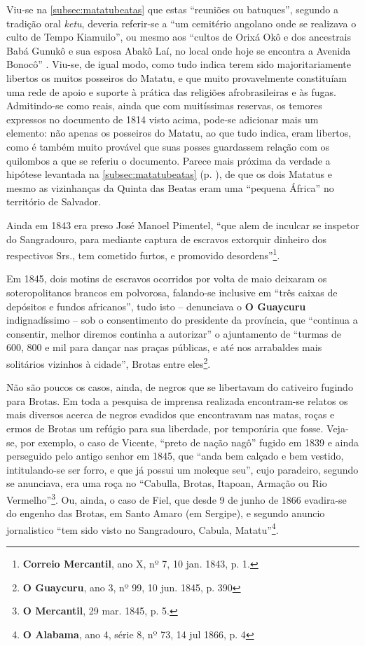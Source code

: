 Viu-se na \autoref{subsec:matatubeatas} que estas ``reuniões ou batuques'', segundo a tradição oral \textit{ketu}, deveria referir-se a ``um cemitério angolano onde se realizava o culto de Tempo Kiamuilo'', ou mesmo aos ``cultos de Orixá Okô e dos ancestrais Babá Gunukô e sua esposa Abakô Laí, no local onde hoje se encontra a Avenida Bonocô'' \cite[pp.~373-374]{silveira_alaketo_2003}. Viu-se, de igual modo, como tudo indica terem sido majoritariamente libertos os muitos posseiros do Matatu, e que muito provavelmente constituíam uma rede de apoio e suporte à prática das religiões afrobrasileiras e às fugas. Admitindo-se como reais, ainda que com muitíssimas reservas, os temores expressos no documento de 1814 visto acima, pode-se adicionar mais um elemento: não apenas os posseiros do Matatu, ao que tudo indica, eram libertos, como é também muito provável que suas posses guardassem relação com os quilombos a que se referiu o documento. Parece mais próxima da verdade a hipótese levantada na \autoref{subsec:matatubeatas} (p. \pageref{subsec:matatubeatas}), de que os dois Matatus e mesmo as vizinhanças da Quinta das Beatas eram uma ``pequena África'' no território de Salvador.

Ainda em 1843 era preso José Manoel Pimentel, ``que alem de inculcar se inspetor do Sangradouro, para mediante captura de escravos extorquir dinheiro dos respectivos Srs., tem cometido furtos, e promovido desordens''\footnote{\textbf{Correio Mercantil}, ano X, nº 7, 10 jan. 1843, p. 1.}.

Em 1845, dois motins de escravos ocorridos por volta de maio deixaram os soteropolitanos brancos em polvorosa, falando-se inclusive em ``três caixas de depósitos e fundos africanos'', tudo isto -- denunciava o \textbf{O Guaycuru} indignadíssimo -- sob o consentimento do presidente da província, que ``continua a consentir, melhor diremos continha a autorizar'' o ajuntamento de ``turmas de  600, 800 e mil para dançar nas praças públicas, e até nos arrabaldes mais solitários vizinhos à cidade'', Brotas entre eles\footnote{\textbf{O Guaycuru}, ano 3, nº 99, 10 jun. 1845, p. 390}.

Não são poucos os casos, ainda, de negros que se libertavam do cativeiro fugindo para Brotas. Em toda a pesquisa de imprensa realizada encontram-se relatos os mais diversos acerca de negros evadidos que encontravam nas matas, roças e ermos de Brotas um refúgio para sua liberdade, por temporária que fosse. Veja-se, por exemplo, o caso de Vicente, ``preto de nação nagô'' fugido em 1839 e ainda perseguido pelo antigo senhor em 1845, que ``anda bem calçado e bem vestido, intitulando-se ser forro, e que já possui um moleque seu'', cujo paradeiro, segundo se anunciava, era uma roça no ``Cabulla, Brotas, Itapoan, Armação ou Rio Vermelho''\footnote{\textbf{O Mercantil}, 29 mar. 1845, p. 5.}. Ou, ainda, o caso de Fiel, que desde 9 de junho de 1866 evadira-se do engenho das Brotas, em Santo Amaro (em Sergipe), e segundo anuncio jornalistico ``tem sido visto no Sangradouro, Cabula, Matatu''\footnote{\textbf{O Alabama}, ano 4, série 8, nº 73, 14 jul 1866, p. 4}. 

